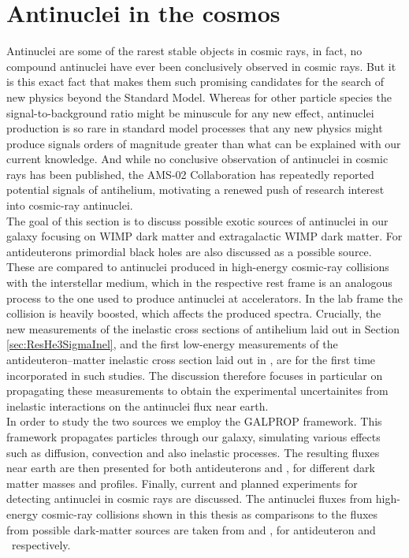 \section{Antinuclei in the cosmos}\label{sec:AntinucleiInTheCosmos}
Antinuclei are some of the rarest stable objects in cosmic rays, in fact, no compound antinuclei have ever been conclusively observed in cosmic rays. But it is this exact fact that makes them such promising candidates for the search of new physics beyond the Standard Model. Whereas for other particle species the signal-to-background ratio might be minuscule for any new effect, antinuclei production is so rare in standard model processes that any new physics might produce signals orders of magnitude greater than what can be explained with our current knowledge. And while no conclusive observation of antinuclei in cosmic rays has been published, the AMS-02 Collaboration has repeatedly reported potential signals of antihelium\cite{}, motivating a renewed push of research interest into cosmic-ray antinuclei. \\
The goal of this section is to discuss possible exotic sources of antinuclei in our galaxy focusing on WIMP dark matter and extragalactic WIMP dark matter. For antideuterons primordial black holes are also discussed as a possible source. These are compared to antinuclei produced in high-energy cosmic-ray collisions with the interstellar medium, which in the respective rest frame is an analogous process to the one used to produce antinuclei at accelerators. In the lab frame the collision is heavily boosted, which affects the produced spectra. Crucially, the new measurements of the inelastic cross sections of antihelium laid out in Section \ref{sec:ResHe3SigmaInel}, and the first low-energy measurements of the antideuteron--matter inelastic cross section laid out in \cite{antideuteronXS}, are for the first time incorporated in such studies. The discussion therefore focuses in particular on propagating these measurements to obtain the experimental uncertainites from inelastic interactions on the antinuclei flux near earth.\\
In order to study the two sources we employ the GALPROP framework\cite{}. This framework propagates particles through our galaxy, simulating various effects such as diffusion, convection and also inelastic processes. The resulting fluxes near earth are then presented for both antideuterons and \ahe, for different dark matter masses and profiles. Finally, current and planned experiments for detecting antinuclei in cosmic rays are discussed. 
The antinuclei fluxes from high-energy cosmic-ray collisions shown in this thesis as comparisons to the fluxes from possible dark-matter sources are taken from \cite{dbar_prop} and \cite{ALICE-PUBLIC-2022-001}, for antideuteron and \ahe\ respectively.



